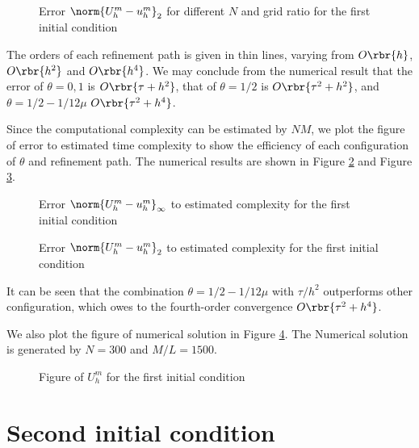\documentclass[english, nochinese]{pnote}
\begin{document}
\begin{figure}
\centering
\scalebox{0.75}{}
\caption{Error $ \norm{ U_h^m - u_h^m }_2 $ for different $N$ and grid ratio for the first initial condition}
\label{Fig:Conv21}
\end{figure}

The orders of each refinement path is given in thin lines, varying from $ O \rbr{h} $, $ O \rbr{h^2} $ and $ O \rbr{h^4} $. We may conclude from the numerical result that the error of $ \theta = 0, 1 $ is $ O \rbr{ \tau + h^2 } $, that of $ \theta = 1 / 2 $ is $ O \rbr{ \tau^2 + h^2 } $, and $ \theta = 1 / 2 - 1 / 12 \mu $ $ O \rbr{ \tau^2 + h^4 } $.

Since the computational complexity can be estimated by $ N M $, we plot the figure of error to estimated time complexity to show the efficiency of each configuration of $\theta$ and refinement path. The numerical results are shown in Figure \ref{Fig:EffI1} and Figure \ref{Fig:Eff21}. 

\begin{figure}
\centering
\scalebox{0.75}{}
\caption{Error $ \norm{ U_h^m - u_h^m }_{\infty} $ to estimated complexity for the first initial condition}
\label{Fig:EffI1}
\end{figure}

\begin{figure}
\centering
\scalebox{0.75}{}
\caption{Error $ \norm{ U_h^m - u_h^m }_2 $ to estimated complexity for the first initial condition}
\label{Fig:Eff21}
\end{figure}

It can be seen that the combination $ \theta = 1 / 2 - 1 / 12 \mu $  with $ \tau / h^2 $ outperforms other configuration, which owes to the fourth-order convergence $ O \rbr{ \tau^2 + h^4 } $.

We also plot the figure of numerical solution in Figure \ref{Fig:NumSol1}. The Numerical solution is generated by $ N = 300 $ and $ M / L = 1500 $.

\begin{figure}
\centering

\caption{Figure of $U_h^m$ for the first initial condition}
\label{Fig:NumSol1}
\end{figure}

\section{Second initial condition}
\end{document}
